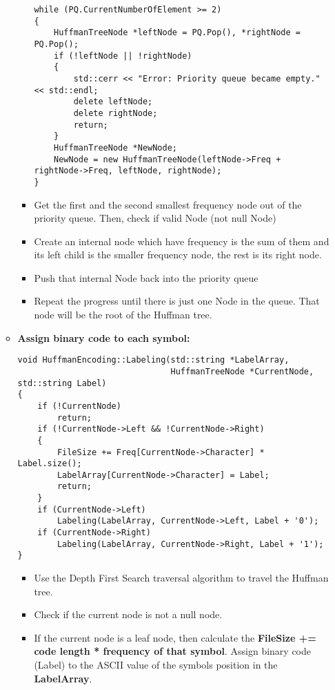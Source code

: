 \begin{enumerate}[label=\textbf{\Alph*.}]
\begin{itemize}
\begin{itemize}
\begin{verbatim}
while (PQ.CurrentNumberOfElement >= 2)
{
    HuffmanTreeNode *leftNode = PQ.Pop(), *rightNode = PQ.Pop();
    if (!leftNode || !rightNode)
    {
        std::cerr << "Error: Priority queue became empty." << std::endl;
        delete leftNode;
        delete rightNode;
        return;
    }
    HuffmanTreeNode *NewNode;
    NewNode = new HuffmanTreeNode(leftNode->Freq + rightNode->Freq, leftNode, rightNode);                     
}
\end{verbatim}
            \item Get the first and the second smallest frequency node out of the priority queue.
            Then, check if valid Node (not null Node)
            \item Create an internal node which have frequency is the sum of them and its left child is the smaller frequency node, the rest is its right node.
            \item Push that internal Node back into the priority queue
            \item Repeat the progress until there is just one Node in the queue. That node will be the root of the Huffman tree.
        \end{itemize}
        \newpage
        \item \textbf{Assign binary code to each symbol:}
\begin{verbatim}
void HuffmanEncoding::Labeling(std::string *LabelArray, 
                               HuffmanTreeNode *CurrentNode, std::string Label)
{
    if (!CurrentNode)
        return;
    if (!CurrentNode->Left && !CurrentNode->Right)
    {
        FileSize += Freq[CurrentNode->Character] * Label.size();
        LabelArray[CurrentNode->Character] = Label;
        return;
    }
    if (CurrentNode->Left)
        Labeling(LabelArray, CurrentNode->Left, Label + '0');
    if (CurrentNode->Right)
        Labeling(LabelArray, CurrentNode->Right, Label + '1');
}
\end{verbatim}
        \begin{itemize}
            \item Use the Depth First Search traversal algorithm to travel the Huffman tree.
            \item Check if the current node is not a null node.
            \item If the current node is a leaf node, then calculate the \textbf{FileSize += code length * frequency of that symbol}. Assign binary code (Label) to the ASCII value of the symbols position in the \textbf{LabelArray}.

\end{itemize}
\end{itemize}
\end{enumerate}
